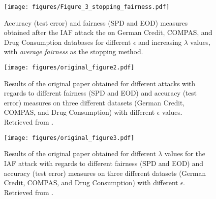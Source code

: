 \begin{figure}[!htb]
    \centering
    \texttt{[image: figures/Figure\_3\_stopping\_fairness.pdf]}
    \caption{Accuracy (test error) and fairness (SPD and EOD) measures obtained after the IAF attack the on German Credit, COMPAS, and Drug Consumption databases for different $\epsilon$ and increasing $\lambda$ values, with \textit{average fairness} as the stopping method.}
    \label{fig:3-stop-fairness}
\end{figure}

\begin{figure}[!htb]
    \centering
    \texttt{[image: figures/original\_figure2.pdf]}
    \caption{Results of the original paper obtained for different attacks with regards to different fairness (SPD and EOD) and accuracy (test error) measures on three different datasets (German Credit, COMPAS, and Drug Consumption) with different $\epsilon$ values. Retrieved from \citep{originalpaper}.}
    \label{fig:orig-fig2}
\end{figure}

\begin{figure}[!htb]
    \centering
    \texttt{[image: figures/original\_figure3.pdf]}
    \caption{Results of the original paper obtained for different $\lambda$ values for the IAF attack with regards to different fairness (SPD and EOD) and accuracy (test error) measures on three different datasets (German Credit, COMPAS, and Drug Consumption) with different $\epsilon$. Retrieved from \citep{originalpaper}.}
    \label{fig:orig-fig3}
\end{figure}


